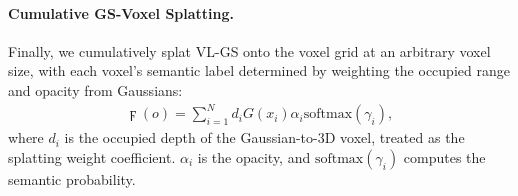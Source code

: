 \paragraph{Cumulative GS-Voxel Splatting.}
Finally, we cumulatively splat VL-GS onto the voxel grid at an arbitrary voxel size, with each voxel's semantic label determined by weighting the occupied range and opacity from Gaussians:
\begin{equation}
\begin{aligned}
    \digamma(o) = \sum_{i=1}^{N} d_i G(x_i) \alpha_{i} \mathrm{softmax}(\gamma_i) ,
\end{aligned}
\end{equation}
where $d_i$ is the occupied depth of the Gaussian-to-3D voxel, treated as the splatting weight coefficient. $\alpha_{i}$ is the opacity, and $\mathrm{softmax}(\gamma_i)$ computes the semantic probability. 


























